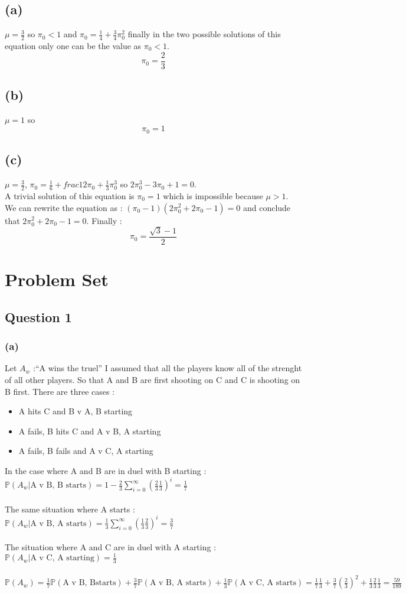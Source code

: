 \documentclass{article}
\begin{document}
\subsection*{(a)}
$\mu = \frac{3}{2}$ so $\pi_0<1$ and $\pi_0 = \frac{1}{4}+\frac{3}{4}\pi_0^2$ finally in the two possible solutions of this equation only one can be the value as $\pi_0<1$.
 $$\boxed{\pi_0 = \frac{2}{3}}$$
\subsection*{(b)}
$\mu = 1$ so $$\boxed{\pi_0 = 1}$$
\subsection*{(c)}
$\mu = \frac{3}{2}$, $\pi_0 = \frac{1}{6}+frac{1}{2}\pi_0+\frac{1}{3}\pi_0^3$ so $2\pi_0^3-3\pi_0+1 = 0$.\\
A trivial solution of this equation is $\pi_0 = 1$ which is impossible because $\mu > 1$. We can rewrite the equation as : $(\pi_0-1)(2\pi_0^2+2\pi_0-1) = 0$
and conclude that $2\pi_0^2+2\pi_0-1 = 0$. Finally : $$\boxed{\pi_0 = \frac{\sqrt{3}-1}{2}}$$
\section*{Problem Set}
\subsection*{Question 1}
\subsubsection*{(a)}
Let $A_w$ :``A wins the truel''
I assumed that all the players know all of the strenght of all other players. So that A and B are first shooting on C and C is shooting on B first.
There are three cases :\begin{itemize}
    \item A hits C and B v A, B starting
    \item A fails, B hits C and A v B, A starting 
    \item A fails, B fails and A v C, A starting
\end{itemize}
In the case where A and B are in duel with B starting : 
\\
$\mathbb{P}(A_w|\text{A v B, B starts}) = 1 - \frac{2}{3}\sum_{i=0}^\infty (\frac{2}{3}\frac{1}{3})^i = \frac{1}{7}$\\
\\
The same situation where A starts : 
\\
$\mathbb{P}(A_w|\text{A v B, A starts}) =\frac{1}{3}\sum_{i=0}^\infty (\frac{1}{3}\frac{2}{3})^i =\frac{3}{7}$
\\\\
The situation where A and C are in duel with A starting :
\\
$\mathbb{P}(A_w|\text{A v C, A starting}) = \frac{1}{3}$
\\\\
$\mathbb{P}(A_w) = \frac{1}{7}\mathbb{P}(\text{A v B, Bstarts}) + \frac{3}{7}\mathbb{P}(\text{A v B, A starts}) + \frac{1}{3}\mathbb{P}(\text{A v C, A starts}) = \frac{1}{7}\frac{1}{3} + \frac{3}{7}(\frac{2}{3})^2+ \frac{1}{3}\frac{2}{3}\frac{1}{3} = \frac{59}{189}$
\end{document}
